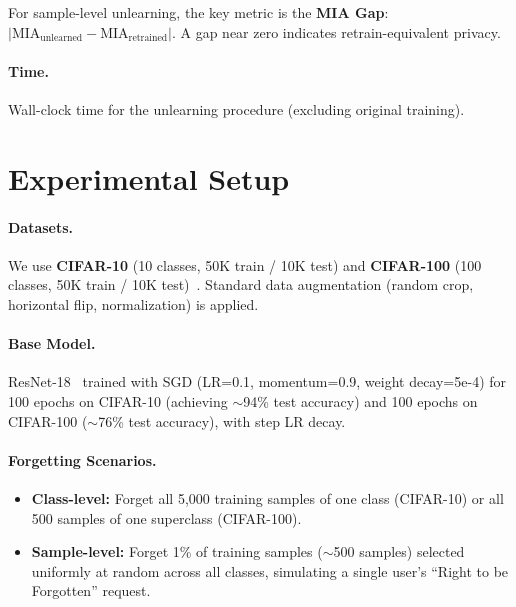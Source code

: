 \documentclass[11pt]{article}
\begin{document}
For sample-level unlearning, the key metric is the \textbf{MIA Gap}: $|\text{MIA}_{\text{unlearned}} - \text{MIA}_{\text{retrained}}|$. A gap near zero indicates retrain-equivalent privacy.

\paragraph{Time.} Wall-clock time for the unlearning procedure (excluding original training).

\section{Experimental Setup}
\label{sec:setup}

\paragraph{Datasets.}
We use \textbf{CIFAR-10} (10 classes, 50K train / 10K test) and \textbf{CIFAR-100} (100 classes, 50K train / 10K test)~\citep{krizhevsky2009learning}. Standard data augmentation (random crop, horizontal flip, normalization) is applied.

\paragraph{Base Model.}
ResNet-18~\citep{he2016deep} trained with SGD (LR=0.1, momentum=0.9, weight decay=5e-4) for 100 epochs on CIFAR-10 (achieving $\sim$94\% test accuracy) and 100 epochs on CIFAR-100 ($\sim$76\% test accuracy), with step LR decay.

\paragraph{Forgetting Scenarios.}
\begin{itemize}[leftmargin=*]
    \item \textbf{Class-level:} Forget all 5,000 training samples of one class (CIFAR-10) or all 500 samples of one superclass (CIFAR-100).
    \item \textbf{Sample-level:} Forget 1\% of training samples ($\sim$500 samples) selected uniformly at random across all classes, simulating a single user's ``Right to be Forgotten'' request.
\end{itemize}
\end{document}
